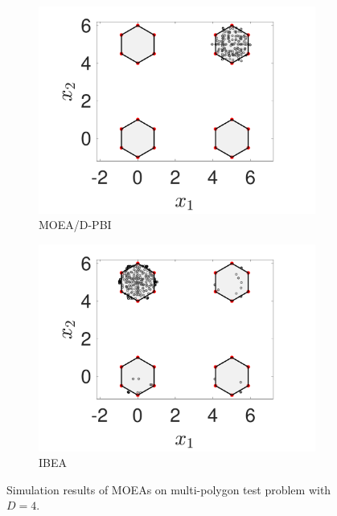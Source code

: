\documentclass[conference]{IEEEtran}
\begin{document}
\begin{figure}[t!]
    \begin{subfigure}[b]{.24\textwidth}
    \includegraphics[width=\linewidth]{Section5/dim4/PS/MOEAD_PBI}
    \caption{MOEA/D-PBI}
    \end{subfigure}
    \begin{subfigure}[b]{.24\textwidth}
    \includegraphics[width=\linewidth]{Section5/dim4/PS/IBEA}
    \caption{IBEA}
    \end{subfigure}

    \caption{Simulation results of MOEAs on multi-polygon test problem with $D=4$.}
    \label{fig: MOEAs PS dim=4}
\end{figure}
\end{document}

